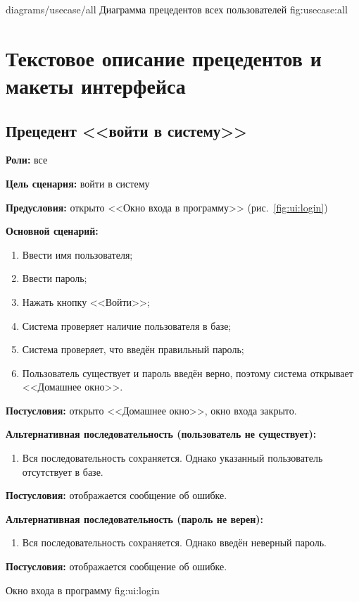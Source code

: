 \image
    {diagrams/usecase/all}
    {Диаграмма прецедентов всех пользователей}
    {fig:usecase:all}



\section{Текстовое описание прецедентов и макеты интерфейса}

\subsection{Прецедент <<войти в систему>>}
\textbf{Роли:} все \par
\textbf{Цель сценария:} войти в систему \par
\textbf{Предусловия:} открыто <<Окно входа в программу>> 
    (рис.~\ref{fig:ui:login}) \par
\textbf{Основной сценарий:} 
\begin{enumerate}
    \item Ввести имя пользователя;
    \item Ввести пароль;
    \item Нажать кнопку <<Войти>>;
    \item Система проверяет наличие пользователя в базе;
    \item Система проверяет, что введён правильный пароль;
    \item Пользователь существует и пароль введён верно, 
        поэтому система открывает <<Домашнее окно>>.
\end{enumerate} \par
\textbf{Постусловия:} открыто <<Домашнее окно>>, окно входа закрыто. \par
\textbf{Альтернативная последовательность (пользователь не существует):} \par
\begin{enumerate}
    \item Вся последовательность сохраняется. Однако указанный пользователь 
        отсутствует в базе.
\end{enumerate} \par
\textbf{Постусловия:} отображается сообщение об ошибке. \par
\textbf{Альтернативная последовательность (пароль не верен):} \par
\begin{enumerate}
    \item Вся последовательность сохраняется. Однако введён неверный пароль.
\end{enumerate} \par
\textbf{Постусловия:} отображается сообщение об ошибке. \par
{}
    {Окно входа в программу}
    {fig:ui:login}

